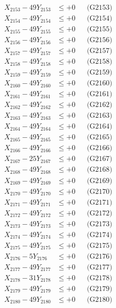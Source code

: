 \documentclass[a4paper,10pt]{article}
\begin{document}
{\begin{align}
X_{2153} - 49Y_{2153} &\leq +0 && \text{(G2153)} \\
X_{2154} - 49Y_{2154} &\leq +0 && \text{(G2154)} \\
X_{2155} - 49Y_{2155} &\leq +0 && \text{(G2155)} \\
X_{2156} - 49Y_{2156} &\leq +0 && \text{(G2156)} \\
X_{2157} - 49Y_{2157} &\leq +0 && \text{(G2157)} \\
X_{2158} - 49Y_{2158} &\leq +0 && \text{(G2158)} \\
X_{2159} - 49Y_{2159} &\leq +0 && \text{(G2159)} \\
X_{2160} - 49Y_{2160} &\leq +0 && \text{(G2160)} \\
\allowbreak
X_{2161} - 49Y_{2161} &\leq +0 && \text{(G2161)} \\
X_{2162} - 49Y_{2162} &\leq +0 && \text{(G2162)} \\
X_{2163} - 49Y_{2163} &\leq +0 && \text{(G2163)} \\
X_{2164} - 49Y_{2164} &\leq +0 && \text{(G2164)} \\
X_{2165} - 49Y_{2165} &\leq +0 && \text{(G2165)} \\
X_{2166} - 49Y_{2166} &\leq +0 && \text{(G2166)} \\
X_{2167} - 25Y_{2167} &\leq +0 && \text{(G2167)} \\
X_{2168} - 49Y_{2168} &\leq +0 && \text{(G2168)} \\
X_{2169} - 49Y_{2169} &\leq +0 && \text{(G2169)} \\
X_{2170} - 49Y_{2170} &\leq +0 && \text{(G2170)} \\
\allowbreak
X_{2171} - 49Y_{2171} &\leq +0 && \text{(G2171)} \\
X_{2172} - 49Y_{2172} &\leq +0 && \text{(G2172)} \\
X_{2173} - 49Y_{2173} &\leq +0 && \text{(G2173)} \\
X_{2174} - 49Y_{2174} &\leq +0 && \text{(G2174)} \\
X_{2175} - 49Y_{2175} &\leq +0 && \text{(G2175)} \\
X_{2176} - 5Y_{2176} &\leq +0 && \text{(G2176)} \\
X_{2177} - 49Y_{2177} &\leq +0 && \text{(G2177)} \\
X_{2178} - 31Y_{2178} &\leq +0 && \text{(G2178)} \\
X_{2179} - 49Y_{2179} &\leq +0 && \text{(G2179)} \\
X_{2180} - 49Y_{2180} &\leq +0 && \text{(G2180)} \\
\allowbreak

\end{align}}
\end{document}

